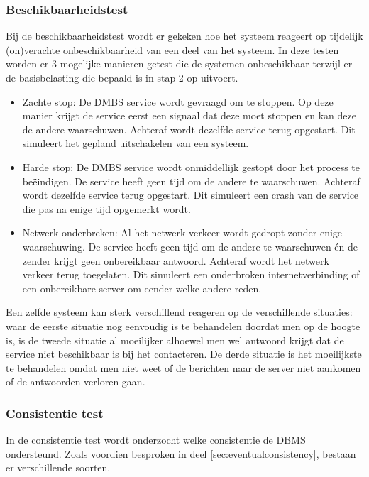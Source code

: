 \subsubsection{Beschikbaarheidstest}
Bij de beschikbaarheidstest wordt er gekeken hoe het systeem reageert op tijdelijk (on)verachte onbeschikbaarheid van een deel van het systeem. In deze testen worden er 3 mogelijke manieren getest die de systemen onbeschikbaar terwijl er de basisbelasting die bepaald is in stap 2 op uitvoert. 
\begin{itemize}
\item Zachte stop: De DMBS service wordt gevraagd om te stoppen. Op deze manier krijgt de service eerst een signaal dat deze moet stoppen en kan deze de andere waarschuwen. Achteraf wordt dezelfde service terug opgestart. Dit simuleert het gepland uitschakelen van een systeem. 

\item Harde stop: De DMBS service wordt onmiddellijk gestopt door het process te beëindigen. De service heeft geen tijd om de andere te waarschuwen. Achteraf wordt dezelfde service terug opgestart. Dit simuleert een crash van de service die pas na enige tijd opgemerkt wordt. 

\item Netwerk onderbreken: Al het netwerk verkeer wordt gedropt zonder enige waarschuwing. De service heeft geen tijd om de andere te waarschuwen én de zender krijgt geen onbereikbaar antwoord. Achteraf wordt het netwerk verkeer terug toegelaten. Dit simuleert een onderbroken internetverbinding of een onbereikbare server om eender welke andere reden. 
\end{itemize} 

Een zelfde systeem kan sterk verschillend reageren op de verschillende situaties: waar de eerste situatie nog eenvoudig is te behandelen doordat men op de hoogte is, is de tweede situatie al moeilijker alhoewel men wel antwoord krijgt dat de service niet beschikbaar is bij het contacteren. De derde situatie is het moeilijkste te behandelen omdat men niet weet of de berichten naar de server niet aankomen of de antwoorden verloren gaan. 
 
\subsubsection{Consistentie test}
In de consistentie test wordt onderzocht welke consistentie de DBMS ondersteund. Zoals voordien besproken in deel \ref{sec:eventualconsistency}, bestaan er verschillende soorten. 

